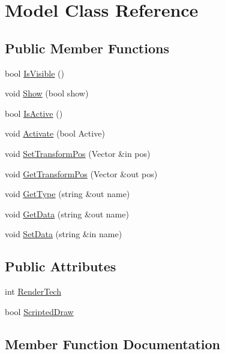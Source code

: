 \hypertarget{class_model}{}\section{Model Class Reference}
\label{class_model}
\subsection*{Public Member Functions}
\begin{DoxyCompactItemize}
\item 
bool \hyperlink{class_model_aa988a434cd21e3a5318865193be886b6}{Is\+Visible} ()
\item 
void \hyperlink{class_model_a80838459aa5009f9b4b98d29e635f763}{Show} (bool show)
\item 
bool \hyperlink{class_model_a40357823a765007f272e2ede1ff9d248}{Is\+Active} ()
\item 
void \hyperlink{class_model_a705b974795edf63872746222451e4205}{Activate} (bool Active)
\item 
void \hyperlink{class_model_a8063a25a2533c896d1af098f65a14edc}{Set\+Transform\+Pos} (Vector \&in pos)
\item 
void \hyperlink{class_model_a45518389353bf38d40467cd53dbaadeb}{Get\+Transform\+Pos} (Vector \&out pos)
\item 
void \hyperlink{class_model_aafd639768deaf78d9f736913b8604698}{Get\+Type} (string \&out name)
\item 
void \hyperlink{class_model_a02269e0237ebe399ea4024cb70ebd854}{Get\+Data} (string \&out name)
\item 
void \hyperlink{class_model_ab2b52d2c8f8eee944a4aeb06085c2c57}{Set\+Data} (string \&in name)
\end{DoxyCompactItemize}
\subsection*{Public Attributes}
\begin{DoxyCompactItemize}
\item 
int \hyperlink{class_model_ae4c4fbc46184372c35031f6f5cc186db}{Render\+Tech}
\item 
bool \hyperlink{class_model_ab32bab73b06f9b7b043b8df0377f1503}{Scripted\+Draw}
\end{DoxyCompactItemize}


\subsection{Member Function Documentation}
\hypertarget{class_model_a705b974795edf63872746222451e4205}{}\label{class_model_a705b974795edf63872746222451e4205} 
